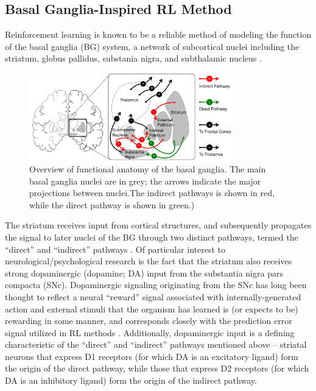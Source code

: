 \documentclass[10pt,letterpaper]{article}
\begin{document}
\subsection{Basal Ganglia-Inspired RL Method}

Reinforcement learning is known to be a reliable method of modeling the function of the basal ganglia (BG) system, a network of subcortical nuclei including the striatum, globus pallidus, substania nigra, and subthalamic nucleus \cite{alexander1990function}.

\begin{figure}[ht]
	\begin{center}
		\includegraphics[width=3.5in]{basal-ganglia.png}
	\end{center}
	\caption{Overview of functional anatomy of the basal ganglia. The main basal ganglia nuclei are in grey; the arrows indicate the major projections between nuclei.The indirect pathways is shown in red, while the direct pathway is shown in green.)} 
	\label{bg}
\end{figure}

The striatum receives input from cortical structures, and subsequently propagates the signal to later nuclei of the BG through two distinct pathways, termed the ``direct'' and ``indirect'' pathways \cite{smith1998microcircuitry}. Of particular interest to neurological/psychological research is the fact that the striatum also receives strong dopaminergic (dopamine; DA) input from the substantia nigra pars compacta (SNc). Dopaminergic signaling originating from the SNc has long been thought to reflect a neural ``reward'' signal associated with internally-generated action and external stimuli that the organism has learned is (or expects to be) rewarding in some manner, and corresponds closely with the prediction error signal utilized in RL methods \cite{schultz2000multuple, schultz1997neural}. Additionally, dopaminergic input is a defining characteristic of the ``direct'' and ``indirect'' pathways mentioned above -- striatal neurons that express D1 receptors (for which DA is an excitatory ligand) form the origin of the direct pathway, while those that express D2 receptors (for which DA is an inhibitory ligand) form the origin of the indirect pathway.
\end{document}
